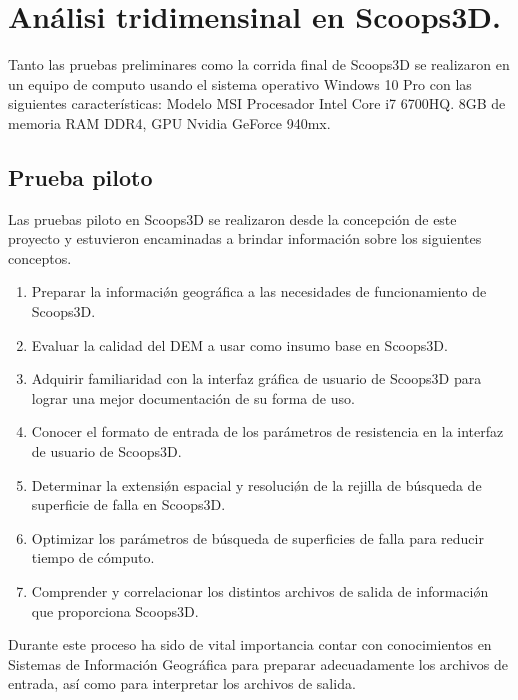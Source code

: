 \chapter{An\'alisi tridimensinal en Scoops3D.}
\label{chap_analisisEnScoops}

Tanto las pruebas preliminares como la corrida final de Scoops3D se realizaron en un equipo de computo usando el sistema operativo Windows 10 Pro con las siguientes caracter\'{i}sticas: Modelo MSI Procesador Intel Core i7 6700HQ. 8GB de memoria RAM DDR4, GPU Nvidia GeForce 940mx.

\section{Prueba piloto} 

Las pruebas piloto en Scoops3D se realizaron desde la concepci\'on de este proyecto y estuvieron encaminadas a brindar informaci\'on sobre los siguientes conceptos.

\begin{enumerate}
  \item Preparar la informaci\'{\o}n geogr\'{a}fica a las necesidades de funcionamiento de Scoops3D.
  \item Evaluar la calidad del DEM a usar como insumo base en Scoops3D.
  \item Adquirir familiaridad con la interfaz gr\'{a}fica de usuario de Scoops3D para lograr una mejor documentaci\'on de su forma de uso.
  \item Conocer el formato de entrada de los par\'{a}metros de resistencia en la interfaz de usuario de Scoops3D.
  \item Determinar la extensi\'{\o}n espacial y resoluci\'{\o}n de la rejilla de b\'{u}squeda de superficie de falla en Scoops3D.
  \item Optimizar los par\'{a}metros de b\'{u}squeda de superficies de falla para reducir tiempo de c\'omputo.
  \item Comprender y correlacionar los distintos archivos de salida de informaci\'{\o}n que proporciona Scoops3D.
\end{enumerate}

Durante este proceso ha sido de vital importancia contar con conocimientos en Sistemas de Informaci\'on Geogr\'afica para preparar adecuadamente los archivos de entrada, as\'i como para interpretar los archivos de salida.
